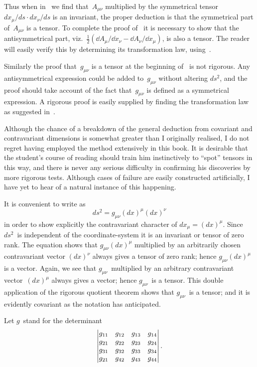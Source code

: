\documentclass[12pt]{book}
\begin{document}
Thus when in~ we find that~$A_{\mu\nu}$ multiplied by the symmetrical tensor~$dx_\mu/ds \cdot dx_\nu/ds$
is an invariant, the proper deduction is that the symmetrical part of~$A_{\mu\nu}$ is a tensor.
To complete the proof of~ it is necessary to show that the antisymmetrical part,
viz.~$\frac{1}{2}(\dd A_\mu/{\dd x_\nu} - \dd A_\nu/{\dd x_\mu})$, is also a tensor.
The reader will easily verify this by determining its transformation law, using~.

Similarly the proof that~$g_{\mu\nu}$ is a tensor at the beginning of~ is not rigorous.
Any antisymmetrical expression could be added to~$g_{\mu\nu}$ without altering $ds^2$, and the proof should take
account of the fact that~$g_{\mu\nu}$ is defined as a symmetrical expression.
A rigorous proof is easily supplied by finding the transformation law as suggested in~.

Although the chance of a breakdown of the general deduction from covariant and contravariant dimensions is somewhat
greater than I originally realised, I do not regret having employed the method extensively in this book.
It is desirable that the student's course of reading should train him instinctively to ``spot'' tensors in this way,
and there is never any serious difficulty in confirming his discoveries by more rigorous tests.
Although cases of failure are easily constructed artificially, I have yet to hear of a natural instance of this
happening.

%

It is convenient to write  as
\[
ds^{2} = g_{\mu\nu} (dx)^{\mu} (dx)^{\nu}
\]
in order to show explicitly the contravariant character of $dx_{\mu} = (dx)^{\mu}$. Since
$ds^{2}$~is independent of the coordinate-system it is an invariant or tensor
of zero rank. The equation shows that $g_{\mu\nu} (dx)^{\mu}$ multiplied by an arbitrarily
chosen contravariant vector $(dx)^{\nu}$ always gives a tensor of zero rank; hence
$g_{\mu\nu} (dx)^{\mu}$ is a vector. Again, we see that $g_{\mu\nu}$~multiplied by an arbitrary contravariant
vector~$(dx)^{\mu}$ always gives a vector; hence $g_{\mu\nu}$~is a tensor. This
double application of the rigorous quotient theorem shows that $g_{\mu\nu}$~is a
tensor; and it is evidently covariant as the notation has anticipated.

Let $g$~stand for the determinant
\[
\left\lvert
\begin{array}{@{}cccc@{}}
  g_{11} & g_{12} & g_{13} & g_{14} \\
  g_{21} & g_{22} & g_{23} & g_{24} \\
  g_{31} & g_{32} & g_{33} & g_{34} \\
  g_{21} & g_{42} & g_{43} & g_{44} \\
\end{array}\right\rvert.
\]
\end{document}
